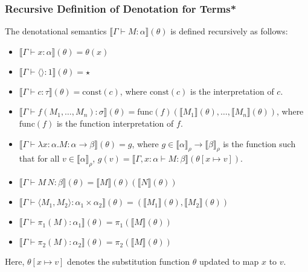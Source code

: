 \documentclass[aspectratio=169]{beamer}
\begin{document}
\begin{frame}
\frametitle{Recursive Definition of Denotation for Terms*}

The denotational semantics $\llbracket \Gamma \vdash M : \alpha \rrbracket (\theta)$ is defined recursively as follows:

\begin{itemize}
    \item $\llbracket \Gamma \vdash x : \alpha \rrbracket (\theta) = \theta(x)$
    \item $\llbracket \Gamma \vdash \langle \rangle : 1 \rrbracket (\theta) = \star$
    \item $\llbracket \Gamma \vdash c : \tau \rrbracket (\theta) = \text{const}(c)$, where $\text{const}(c)$ is the interpretation of $c$.
    \item $\llbracket \Gamma \vdash f(M_1, \ldots, M_n) : \sigma \rrbracket (\theta) = \text{func}(f)(\llbracket M_1 \rrbracket(\theta), \ldots, \llbracket M_n \rrbracket(\theta))$, where $\text{func}(f)$ is the function interpretation of $f$.
    \item $\llbracket \Gamma \vdash \lambda x : \alpha. M : \alpha \rightarrow \beta \rrbracket (\theta) = g$, where $g \in \llbracket \alpha \rrbracket_\rho \rightarrow \llbracket \beta \rrbracket_\rho$ is the function such that for all $v \in \llbracket \alpha \rrbracket_\rho$, $g(v) = \llbracket \Gamma, x:\alpha \vdash M : \beta \rrbracket (\theta[x \mapsto v])$.
    \item $\llbracket \Gamma \vdash M \, N : \beta \rrbracket (\theta) = \llbracket M \rrbracket(\theta)(\llbracket N \rrbracket(\theta))$
    \item $\llbracket \Gamma \vdash \langle M_1, M_2 \rangle : \alpha_1 \times \alpha_2 \rrbracket (\theta) = (\llbracket M_1 \rrbracket(\theta), \llbracket M_2 \rrbracket(\theta))$
    \item $\llbracket \Gamma \vdash \pi_1(M) : \alpha_1 \rrbracket (\theta) = \pi_1(\llbracket M \rrbracket(\theta))$
    \item $\llbracket \Gamma \vdash \pi_2(M) : \alpha_2 \rrbracket (\theta) = \pi_2(\llbracket M \rrbracket(\theta))$
\end{itemize}

Here, $\theta[x \mapsto v]$ denotes the substitution function $\theta$ updated to map $x$ to $v$.
\end{frame}
\end{document}
